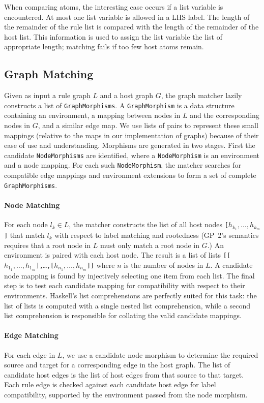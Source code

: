 When comparing atoms, the interesting case occurs if a list variable is encountered. At most one list variable is allowed in a LHS label. The length of the remainder of the rule list is compared with the length of the remainder of the host list. This information is used to assign the list variable the list of appropriate length; matching fails if too few host atoms remain.

\subsection{Graph Matching}\label{sec:graph-match}

Given as input a rule graph $L$ and a host graph $G$, the graph matcher lazily constructs a list of \texttt{GraphMorphisms}. A \texttt{GraphMorphism} is a data structure containing an environment, a mapping between nodes in $L$ and the corresponding nodes in $G$, and a similar edge map. We use lists of pairs to represent these small mappings (relative to the maps in our implementation of graphs) because of their ease of use and understanding.  Morphisms are generated in two stages. First the candidate \texttt{NodeMorphisms} are identified, where a \texttt{NodeMorphism} is an environment and a node mapping. For each such \texttt{NodeMorphism}, the matcher searches for compatible edge mappings and environment extensions to form a set of complete \texttt{GraphMorphisms}.

\paragraph{Node Matching}
For each node $l_k \in L$, the matcher constructs the list of all host nodes \texttt{[$h_{k_1}, \ldots, h_{k_m}$]} that match $l_k$ with respect to label matching and rootedness (GP~2's semantics requires that a root node in $L$ must only match a root node in $G$.) An environment is paired with each host node. The result is a list of lists \texttt{[[$h_{1_1}, \ldots, h_{1_m}$],\ldots,[$h_{n_1}, \ldots, h_{n_m}$]]} where $n$ is the number of nodes in $L$. A candidate node mapping is found by injectively selecting one item from each list. The final step is to test each candidate mapping for compatibility with respect to their environments. Haskell's list comprehensions are perfectly suited for this task: the list of lists is computed with a single nested list comprehension, while a second list comprehension is responsible for collating the valid candidate mappings. 

\paragraph{Edge Matching} 
For each edge in $L$, we use a candidate node morphism to determine the required source and target for a corresponding edge in the host graph. The list of candidate host edges is the list of host edges from that source to that target. Each rule edge is checked against each candidate host edge for label compatibility, supported by the environment passed from the node morphism.

